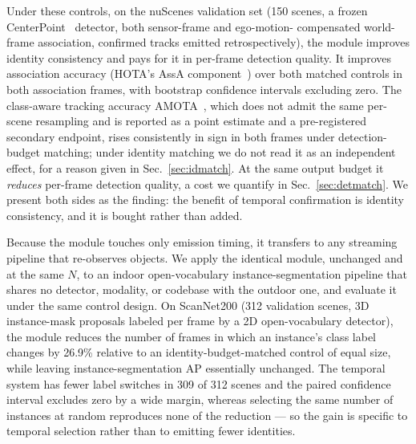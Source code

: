 Under these controls, on the nuScenes validation set (150 scenes, a frozen
CenterPoint~\cite{centerpoint} detector, both sensor-frame and ego-motion-%
compensated world-frame association, confirmed tracks emitted
retrospectively), the module improves identity consistency and pays for it in
per-frame detection quality. It improves
association accuracy (HOTA's AssA component~\cite{hota}) over both matched
controls in both association frames, with bootstrap confidence intervals
excluding zero. The class-aware tracking accuracy
AMOTA~\cite{nuscenes_tracking}, which does not admit the same per-scene
resampling and is reported as a point estimate and a pre-registered secondary
endpoint, rises consistently in sign in both frames under detection-budget
matching; under identity matching we do not read it as an independent effect,
for a reason given in Sec.~\ref{sec:idmatch}. At the same output budget it
\emph{reduces} per-frame detection quality, a cost we quantify in
Sec.~\ref{sec:detmatch}. We present both sides as the finding: the benefit of
temporal confirmation is identity consistency, and it is bought rather than
added.

Because the module touches only emission timing, it transfers to any streaming
pipeline that re-observes objects. We apply the identical module, unchanged
and at the same $N$, to an indoor open-vocabulary instance-segmentation
pipeline that shares no detector, modality, or codebase with the outdoor one,
and evaluate it under the same control design. On ScanNet200 (312 validation
scenes, 3D instance-mask proposals labeled per frame by a 2D open-vocabulary
detector), the module reduces the number of frames in which an instance's
class label changes by 26.9\% relative to an identity-budget-matched control
of equal size, while leaving instance-segmentation AP essentially unchanged. The
temporal system has fewer label switches in 309 of 312 scenes and the paired
confidence interval excludes zero by a wide margin, whereas selecting the same
number of instances at random reproduces none of the reduction --- so the gain
is specific to temporal selection rather than to emitting fewer identities.

